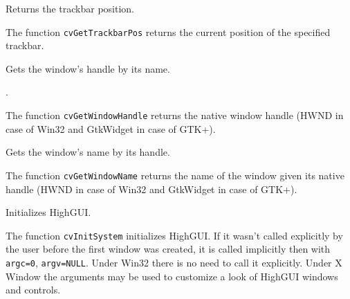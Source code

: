 Returns the trackbar position.


\begin{description}
\end{description}

The function \texttt{cvGetTrackbarPos} returns the current position of the specified trackbar.

\ifC

Gets the window's handle by its name.


\begin{description}
.
\end{description}

The function \texttt{cvGetWindowHandle} returns the native window handle (HWND in case of Win32 and GtkWidget in case of GTK+).

Gets the window's name by its handle.


\begin{description}
\end{description}

The function \texttt{cvGetWindowName} returns the name of the window given its native handle (HWND in case of Win32 and GtkWidget in case of GTK+).

Initializes HighGUI.


\begin{description}
\end{description}

The function \texttt{cvInitSystem} initializes HighGUI. If it wasn't
called explicitly by the user before the first window was created, it is
called implicitly then with \texttt{argc=0}, \texttt{argv=NULL}. Under
Win32 there is no need to call it explicitly. Under X Window the arguments
may be used to customize a look of HighGUI windows and controls.

